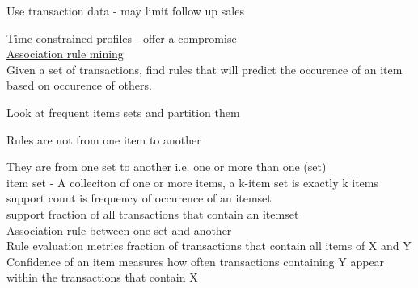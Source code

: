\documentclass{article}
\begin{document}
Use transaction data - may limit follow up sales

Time constrained profiles - offer a compromise \\

\underline{Association rule mining} \\
Given a set of transactions, find rules that will predict the occurence of an item based on occurence of others.

Look at frequent items sets and partition them

Rules are not from one item to another

They are from one set to another i.e. one or more than one (set)\\

item set - A colleciton of one or more items, a k-item set is exactly k items \\
support count is frequency of occurence of an itemset\\
support fraction of all transactions that contain an itemset\\
Association rule between one set and another\\
Rule evaluation metrics fraction of transactions that contain all items of X and Y\\
Confidence of an item measures how often transactions containing Y appear within the transactions that contain X\\
\end{document}
